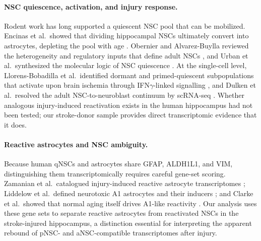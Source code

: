 \paragraph{NSC quiescence, activation, and injury response.}
Rodent work has long supported a quiescent NSC pool that can be mobilized. Encinas et al.\ showed that dividing hippocampal NSCs ultimately convert into astrocytes, depleting the pool with age \cite{encinas2011division}. Obernier and Alvarez-Buylla reviewed the heterogeneity and regulatory inputs that define adult NSCs \cite{obernier2019neural}, and Urban et al.\ synthesized the molecular logic of NSC quiescence \cite{urban2019quiescence}. At the single-cell level, Llorens-Bobadilla et al.\ identified dormant and primed-quiescent subpopulations that activate upon brain ischemia through IFN$\gamma$-linked signalling \cite{llorensbobadilla2015single}, and Dulken et al.\ resolved the adult NSC-to-neuroblast continuum by scRNA-seq \cite{dulken2017single}. Whether analogous injury-induced reactivation exists in the human hippocampus had not been tested; our stroke-donor sample provides direct transcriptomic evidence that it does.

\paragraph{Reactive astrocytes and NSC ambiguity.}
Because human qNSCs and astrocytes share GFAP, ALDH1L1, and VIM, distinguishing them transcriptomically requires careful gene-set scoring. Zamanian et al.\ catalogued injury-induced reactive astrocyte transcriptomes \cite{zamanian2012genomic}; Liddelow et al.\ defined neurotoxic A1 astrocytes and their inducers \cite{liddelow2017neurotoxic}; and Clarke et al.\ showed that normal aging itself drives A1-like reactivity \cite{clarke2018normal}. Our analysis uses these gene sets to separate reactive astrocytes from reactivated NSCs in the stroke-injured hippocampus, a distinction essential for interpreting the apparent rebound of pNSC- and aNSC-compatible transcriptomes after injury.

